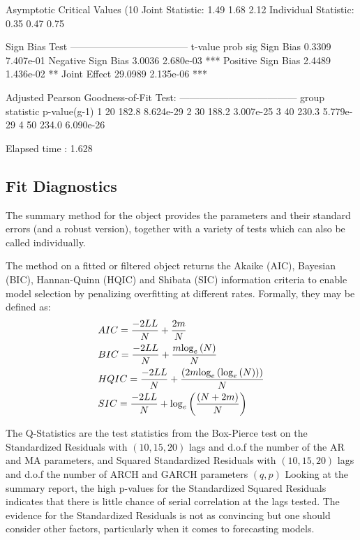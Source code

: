 \begin{Schunk}
\begin{Soutput}
Asymptotic Critical Values (10%
Joint Statistic:         1.49 1.68 2.12
Individual Statistic:    0.35 0.47 0.75

Sign Bias Test
------------------------------------
                   t-value      prob sig
Sign Bias           0.3309 7.407e-01
Negative Sign Bias  3.0036 2.680e-03 ***
Positive Sign Bias  2.4489 1.436e-02  **
Joint Effect       29.0989 2.135e-06 ***


Adjusted Pearson Goodness-of-Fit Test:
------------------------------------
  group statistic p-value(g-1)
1    20     182.8    8.624e-29
2    30     188.2    3.007e-25
3    40     230.3    5.779e-29
4    50     234.0    6.090e-26


Elapsed time : 1.628
\end{Soutput}
\end{Schunk}

\subsection{Fit Diagnostics}\label{section:diagnostics}
The summary method for the \verb@uGARCHfit@ object provides the parameters and
their standard errors (and a robust version), together with a variety of tests
which can also be called individually.

The \verb@inforcriteria@ method on a fitted or filtered object returns the
Akaike (AIC), Bayesian (BIC), Hannan-Quinn (HQIC) and Shibata (SIC) information
criteria to enable model selection by penalizing overfitting at different rates.
Formally, they may be defined as:
\begin{equation}\label{inforcriteria}
\begin{gathered}
  AIC = \frac{{ - 2LL}}
{N} + \frac{{2m}}
{N} \hfill \\
  BIC = \frac{{ - 2LL}}
{N} + \frac{{m{{\log }_e}\left( N \right)}}
{N} \hfill \\
  HQIC = \frac{{ - 2LL}}
{N} + \frac{{\left( {2m{{\log }_e}\left( {{{\log }_e}\left( N \right)} \right)} \right)}}
{N} \hfill \\
  SIC = \frac{{ - 2LL}}
{N} + {\log _e}\left( {\frac{{\left( {N + 2m} \right)}}
{N}} \right) \hfill \\
\end{gathered}
\end{equation}

The Q-Statistics are the test statistics from the Box-Pierce test on the
Standardized Residuals with $(10,15,20)$ lags and d.o.f the number of the
AR and MA parameters, and Squared Standardized Residuals with
$(10,15,20)$ lags and d.o.f the number of ARCH and GARCH parameters $(q,p)$
Looking at the summary report, the high p-values for the Standardized Squared
Residuals indicates that there is little chance of serial correlation at the
lags tested. The evidence for the Standardized Residuals is not as convincing
but one should consider other factors, particularly when it comes to forecasting
models.

